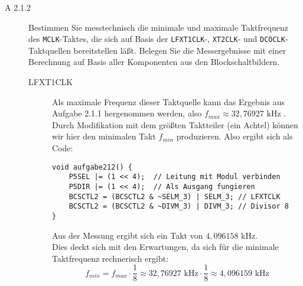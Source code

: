 \documentclass[11pt,a4paper,ngerman]{article}
\begin{document}
\begin{description}
	\item[A 2.1.2] Bestimmen Sie messtechnisch die minimale und maximale Taktfrequenz des \texttt{MCLK}-Taktes, die sich auf Basis der \texttt{LFXT1CLK}-, \texttt{XT2CLK}- und \texttt{DCOCLK}-Taktquellen bereitstellen läßt. Belegen Sie die Messergebnisse mit einer Berechnung auf Basis aller Komponenten aus den Blockschaltbildern.
		
		\begin{description}
			\item[LFXT1CLK] Als maximale Frequenz dieser Taktquelle kann das Ergebnis aus Aufgabe 2.1.1 hergenommen werden, also $f_{max} \approx 32,76927 \text{ kHz }$. Durch Modifikation mit dem größten Taktteiler (ein Achtel) können wir hier den minimalen Takt $f_{min}$ produzieren. Also ergibt sich als Code:
\begin{lstlisting}
void aufgabe212() {
    P5SEL |= (1 << 4);	// Leitung mit Modul verbinden
    P5DIR |= (1 << 4);	// Als Ausgang fungieren
    BCSCTL2 = (BCSCTL2 & ~SELM_3) | SELM_3; // LFXTCLK
    BCSCTL2 = (BCSCTL2 & ~DIVM_3) | DIVM_3; // Divisor 8
}
\end{lstlisting}
			Aus der Messung ergibt sich ein Takt von $4,096158$ kHz. \\
			Dies deckt sich mit den Erwartungen, da sich für die minimale Taktfrequenz rechnerisch ergibt:
			$$ f_{min} = f_{max} \cdot \frac{1}{8} \approx 32,76927 \text{ kHz} \cdot \frac{1}{8} \approx 4,096159 \text{ kHz}$$
			

\end{description}
\end{description}
\end{document}
